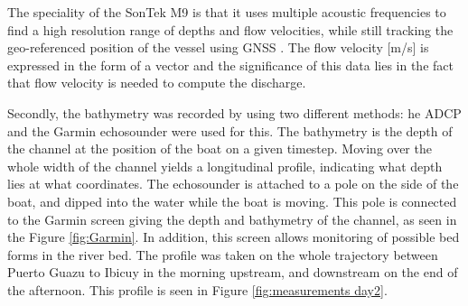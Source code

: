 The speciality of the SonTek M9 is that it uses multiple acoustic frequencies to find a high resolution range of depths and flow velocities, while still tracking the geo-referenced position of the vessel using GNSS \autocite{ysiinc.SonTekM9}. The flow velocity [m/s] is expressed in the form of a vector and the significance of this data lies in the fact that flow velocity is needed to compute the discharge.

Secondly, the bathymetry was recorded by using two different methods: he ADCP and the Garmin echosounder were used for this. The bathymetry is the depth of the channel at the position of the boat on a given timestep. Moving over the whole width of the channel yields a longitudinal profile, indicating what depth lies at what coordinates.
The echosounder is attached to a pole on the side of the boat, and dipped into the water while the boat is moving. This pole is connected to the Garmin screen giving the depth and bathymetry of the channel, as seen in the Figure \ref{fig:Garmin}. In addition, this screen allows monitoring of possible bed forms in the river bed. The profile was taken on the whole trajectory between Puerto Guazu to Ibicuy in the morning upstream, and downstream on the end of the afternoon. This profile is seen in Figure \ref{fig:measurements day2}.

